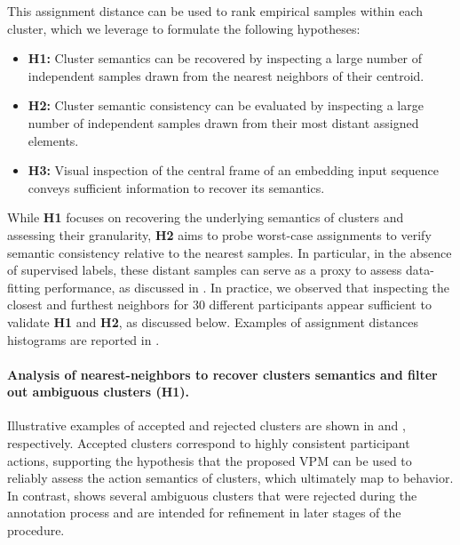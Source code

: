         This assignment distance can be used to rank empirical samples within each cluster, which we leverage to formulate the following hypotheses:  
        \begin{itemize}
            \item \textbf{H1:} Cluster semantics can be recovered by inspecting a large number of independent samples drawn from the nearest neighbors of their centroid.
            \item \textbf{H2:} Cluster semantic consistency can be evaluated by inspecting a large number of independent samples drawn from their most distant assigned elements.
            \item \textbf{H3:} Visual inspection of the central frame of an embedding input sequence conveys sufficient information to recover its semantics.
        \end{itemize}
        While \textbf{H1} focuses on recovering the underlying semantics of clusters and assessing their granularity, \textbf{H2} aims to probe worst-case assignments to verify semantic consistency relative to the nearest samples. In particular, in the absence of supervised labels, these distant samples can serve as a proxy to assess data-fitting performance, as discussed in . In practice, we observed that inspecting the closest and furthest neighbors for $30$ different participants appear sufficient to validate \textbf{H1} and \textbf{H2}, as discussed below. Examples of assignment distances histograms are reported in .

        \paragraph{Analysis of nearest-neighbors to recover clusters semantics and filter out ambiguous clusters (H1).\\}

        Illustrative examples of accepted and rejected clusters are shown in  and , respectively. Accepted clusters correspond to highly consistent participant actions, supporting the hypothesis that the proposed VPM can be used to reliably assess the action semantics of clusters, which ultimately map to behavior. In contrast,  shows several ambiguous clusters that were rejected during the annotation process and are intended for refinement in later stages of the procedure.

